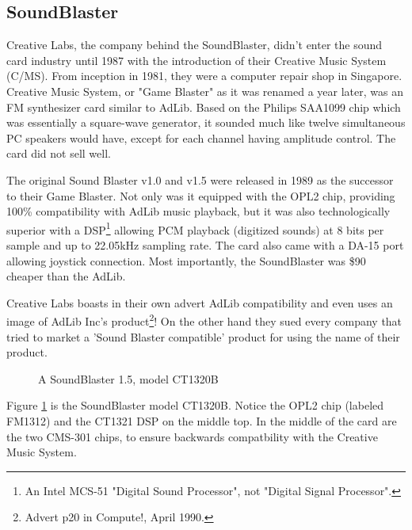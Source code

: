 \documentclass[book.tex]{subfiles}
\begin{document}
 
  


  \subsection{SoundBlaster}
  Creative Labs, the company behind the SoundBlaster, didn't enter the sound card industry until 1987 with the introduction of their Creative Music System (C/MS). From inception in 1981, they were a computer repair shop in Singapore. Creative Music System, or "Game Blaster" as it was renamed a year later, was an FM synthesizer card similar to AdLib. Based on the Philips SAA1099 chip which was essentially a square-wave generator, it sounded much like twelve simultaneous PC speakers would have, except for each channel having amplitude control. The card did not sell well.\\
  
  \par
The original Sound Blaster v1.0 and v1.5 were released in 1989 as the successor to their Game Blaster. Not only was it equipped with the OPL2 chip, providing 100\% compatibility with AdLib music playback, but it was also technologically superior with a DSP\footnote{An Intel MCS-51 "Digital Sound Processor", not "Digital Signal Processor".} allowing PCM playback (digitized sounds) at 8 bits per sample and up to 22.05kHz sampling rate. The card also came with a DA-15 port allowing joystick connection. Most importantly, the SoundBlaster was \$90 cheaper than the AdLib.\\


\par
{}
Creative Labs boasts in their own advert AdLib compatibility and even uses an image of AdLib Inc's product\footnote{Advert p20 in Compute!, April 1990.}! On the other hand they sued every company that tried to market a 'Sound Blaster compatible' product for using the name of their product.\\


\begin{figure}[H] 
  \centering 
  \caption{A SoundBlaster 1.5, model CT1320B }
  \label{asb15}
\end{figure}

\par
Figure \ref{asb15} is the SoundBlaster model CT1320B. Notice the OPL2 chip (labeled FM1312) and the CT1321 DSP on the middle top. In the middle of the card are the two CMS-301 chips, to ensure backwards compatbility with the Creative Music System.\\
\end{document}
